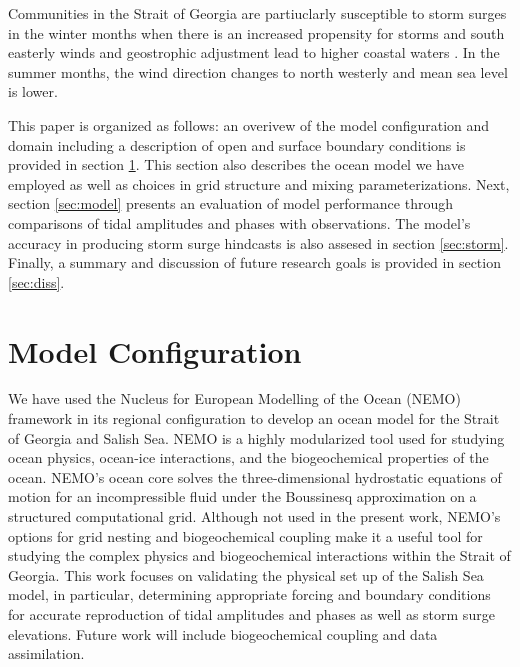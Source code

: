\documentclass[pdftex,10pt]{article}
\begin{document}
Communities in the Strait of Georgia are partiuclarly susceptible to storm surges in the winter months when there is an increased propensity for storms and south easterly winds and geostrophic adjustment lead to higher coastal waters \citep{danard2003storm}. In the summer months, the wind direction changes to north westerly and mean sea level is lower. 


This paper is organized as follows: an overivew of the model configuration and domain including a description of open and surface boundary conditions is provided in section \ref{sec:config}. This section also describes the ocean model we have employed as well as choices in grid structure and mixing parameterizations. Next, section \ref{sec:model} presents an evaluation of model performance through comparisons of tidal amplitudes and phases with observations. The model's accuracy in producing storm surge hindcasts is also assesed in section \ref{sec:storm}. Finally, a summary and discussion of future research goals is provided in section \ref{sec:diss}.  

\section{Model Configuration}\label{sec:config}

We have used the Nucleus for European Modelling of the Ocean (NEMO) framework in its regional configuration to develop an ocean model for the Strait of Georgia and Salish Sea. NEMO is a highly modularized tool used for studying ocean physics, ocean-ice interactions, and the biogeochemical properties of the ocean. NEMO's ocean core solves the three-dimensional hydrostatic equations of motion for an incompressible fluid under the Boussinesq approximation on a structured computational grid. Although not used in the present work, NEMO's options for grid nesting and biogeochemical coupling make it a useful tool for studying the complex physics and biogeochemical interactions within the Strait of Georgia. This work focuses on validating the physical set up of the Salish Sea model, in particular, determining appropriate forcing and boundary conditions for accurate reproduction of tidal amplitudes and phases as well as storm surge elevations. Future work will include biogeochemical coupling and data assimilation. 
\end{document}
